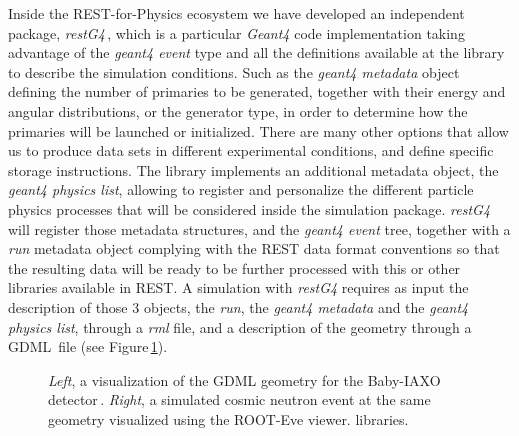Inside the REST-for-Physics ecosystem we have developed an independent package, \emph{restG4}\,\cite{REST_restG4_Git}, which is a particular \emph{Geant4} code implementation taking advantage of the \emph{geant4 event} type and all the definitions available at the library to describe the simulation conditions. Such as the \emph{geant4 metadata} object defining the number of primaries to be generated, together with their energy and angular distributions, or the generator type, in order to determine how the primaries will be launched or initialized. There are many other options that allow us to produce data sets in different experimental conditions, and define specific storage instructions. The library implements an additional metadata object, the \emph{geant4 physics list}, allowing to register and personalize the different particle physics processes that will be considered inside the simulation package. \emph{restG4} will register those metadata structures, and the \emph{geant4 event} tree, together with a \emph{run} metadata object complying with the REST data format conventions so that the resulting data will be ready to be further processed with this or other libraries available in REST. A simulation with \emph{restG4} requires as input the description of those 3 objects, the \emph{run}, the \emph{geant4 metadata} and the \emph{geant4 physics list}, through a \emph{rml} file, and a description of the geometry through a GDML\,\cite{Chytracek:2006be} file (see Figure\,\ref{fig:geant4lib}).



\begin{figure}[htb!]
  \centering
	\caption{\emph{Left}, a visualization of the GDML geometry for the Baby-IAXO detector\,\cite{BabyIAXO:2020mzw}. \emph{Right}, a simulated cosmic neutron event at the same geometry visualized using the ROOT-Eve viewer. libraries.}\label{fig:geant4lib}
\end{figure}

